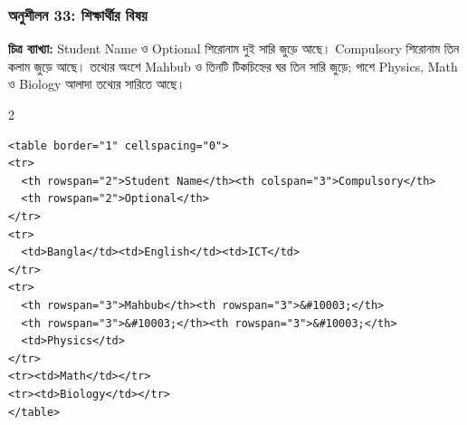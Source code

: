 \par\noindent\subsubsection{অনুশীলন 33: শিক্ষার্থীর বিষয়}%
\noindent
\textbf{চিত্র ব্যাখ্যা:} Student Name ও Optional শিরোনাম দুই সারি জুড়ে আছে। Compulsory শিরোনাম তিন কলাম জুড়ে আছে। তথ্যের অংশে Mahbub ও তিনটি টিকচিহ্নের ঘর তিন সারি জুড়ে; পাশে Physics, Math ও Biology আলাদা তথ্যের সারিতে আছে।
\par\smallskip
\noindent\begin{minipage}[t]{\linewidth}\vspace{0pt}
\begingroup\centering
{}
\par\endgroup
\end{minipage}
\par\smallskip
{}
\par{}\par\smallskip
\begin{multicols}{2}
\begin{verbatim}
<table border="1" cellspacing="0">
<tr>
  <th rowspan="2">Student Name</th><th colspan="3">Compulsory</th>
  <th rowspan="2">Optional</th>
</tr>
<tr>
  <td>Bangla</td><td>English</td><td>ICT</td>
</tr>
<tr>
  <th rowspan="3">Mahbub</th><th rowspan="3">&#10003;</th>
  <th rowspan="3">&#10003;</th><th rowspan="3">&#10003;</th>
  <td>Physics</td>
</tr>
<tr><td>Math</td></tr>
<tr><td>Biology</td></tr>
</table>
\end{verbatim}
\end{multicols}
\smallskip


